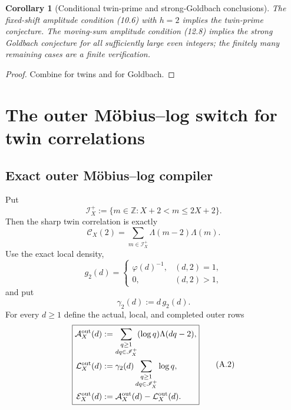 \documentclass[11pt]{article}
\newtheorem{corollary}[theorem]{Corollary}
\theoremstyle{definition}
\theoremstyle{remark}
\begin{document}
\begin{corollary}[Conditional twin-prime and strong-Goldbach conclusions]
\label{cor:headline-conditional}
The fixed-shift amplitude condition \textup{(10.6)} with $h=2$ implies the
twin-prime conjecture.  The moving-sum amplitude condition \textup{(12.8)}
implies the strong Goldbach conjecture for all sufficiently large even
integers; the finitely many remaining cases are a finite verification.
\end{corollary}

\begin{proof}
Combine  for twins and
 for Goldbach.
\end{proof}



\section{The outer M\"obius--log switch for twin correlations}
\label{sec:affine-outer}

\subsection{Exact outer M\"obius--log compiler}
\label{subsec:affouter-outer-compiler}

Put
\[
 \mathscr I_X^+
 :=\{m\in\mathbb Z:X+2<m\le2X+2\}.
\]
Then the sharp twin correlation is exactly
\begin{equation}
 \label{eq:affouter-shifted-pair}
 \boxed{
 \mathcal C_X(2)
 =\sum_{m\in\mathscr I_X^+}\Lambda(m-2)\Lambda(m).}
 \tag{A.1}
\end{equation}
Use the exact local density,
\[
 g_2(d)=
 \begin{cases}
  \varphi(d)^{-1},&(d,2)=1,\\
  0,&(d,2)>1,
 \end{cases}
\]
and put
\[
 \gamma_2(d):=d\,g_2(d).
\]
For every $d\ge1$ define the actual, local, and completed outer rows
\begin{equation}
 \label{eq:affouter-outer-rows}
 \boxed{
 \begin{aligned}
 \mathcal A_X^{\rm out}(d)
 &:=\sum_{\substack{q\ge1\\dq\in\mathscr I_X^+}}
      (\log q)\Lambda(dq-2),\\
 \mathcal L_X^{\rm out}(d)
 &:=\gamma_2(d)
      \sum_{\substack{q\ge1\\dq\in\mathscr I_X^+}}
      \log q,\\
 \mathcal E_X^{\rm out}(d)
 &:=\mathcal A_X^{\rm out}(d)
   -\mathcal L_X^{\rm out}(d).
 \end{aligned}}
 \tag{A.2}
\end{equation}
\end{document}
